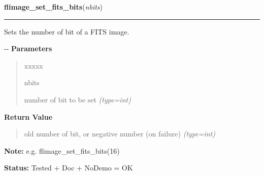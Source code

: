     \label{xformslib:flflimage:flimage_set_fits_bits}

    \vspace{0.5ex}

\hspace{.8\funcindent}\begin{boxedminipage}{\funcwidth}

    \raggedright \textbf{flimage\_set\_fits\_bits}(\textit{nbits})

    \vspace{-1.5ex}

    \rule{\textwidth}{0.5\fboxrule}
\setlength{\parskip}{2ex}

Sets the number of bit of a FITS image.

-{}-
\setlength{\parskip}{1ex}
      \textbf{Parameters}
      \vspace{-1ex}

      \begin{quote}
        \begin{Ventry}{xxxxx}

          \item[nbits]


number of bit to be set
            {\it (type=int)}

        \end{Ventry}

      \end{quote}

      \textbf{Return Value}
    \vspace{-1ex}

      \begin{quote}

old number of bit, or negative number (on failure)
      {\it (type=int)}

      \end{quote}

\textbf{Note:} 
e.g. flimage\_set\_fits\_bits(16)


\textbf{Status:} 
Tested + Doc + NoDemo = OK


    \end{boxedminipage}

    \label{xformslib:flflimage:flimage_jpeg_output_options}

